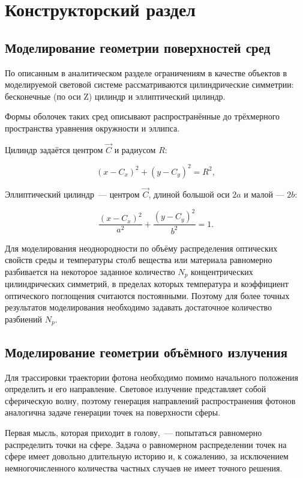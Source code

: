 \chapter{Конструкторский раздел}

\section{Моделирование геометрии поверхностей сред}

По описанным в аналитическом разделе ограничениям в качестве объектов в моделируемой световой системе рассматриваются цилиндрические симметрии: бесконечные (по оси Z) цилиндр и эллиптический цилиндр.

Формы оболочек таких сред описывают распространённые до трёхмерного пространства уравнения окружности и эллипса.

Цилиндр задаётся центром $\vec C$ и радиусом $R$:

\begin{equation}
	\label{eqn:cylinder}
	(x - C_x)^2 + (y - C_y)^2 = R^2,
\end{equation}

Эллиптический цилиндр~— центром $\vec C$, длиной большой оси $2a$ и малой — $2b$:

\begin{equation}
	\label{eqn:elliptic-cylinder}
	\frac{(x - C_x)^2}{a^2} + \frac{(y - C_y)^2}{b^2} = 1.
\end{equation}

Для моделирования неоднородности по объёму распределения оптических свойств среды и температуры столб вещества или материала равномерно разбивается на некоторое заданное количество $N_p$ концентрических цилиндрических симметрий, в пределах которых температура и коэффициент оптического поглощения считаются постоянными.
Поэтому для более точных результатов моделирования необходимо задавать достаточное количество разбиений $N_p$.

\section{Моделирование геометрии объёмного излучения}

Для трассировки траектории фотона необходимо помимо начального положения определить и его направление.
Световое излучение представляет собой сферическую волну, поэтому генерация направлений распространения фотонов аналогична задаче генерации точек на поверхности сферы.

Первая мысль, которая приходит в голову,~— попытаться равномерно распределить точки на сфере. Задача о равномерном распределении точек на сфере имеет довольно длительную историю и, к сожалению, за исключением немногочисленного количества частных случаев не имеет точного решения.

